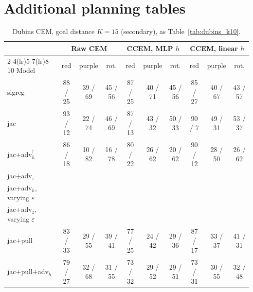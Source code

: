 \documentclass{article}
\begin{document}
\section{Additional planning tables}
\label{app:planning}
\begin{table}[t]\centering\small
\caption{Dubins CEM, goal distance $K=15$ (secondary), as Table~\ref{tab:dubins_k10}.}
\label{tab:dubins_k15}
\begin{tabular}{lccccccccc}
\toprule
 & \multicolumn{3}{c}{Raw CEM} & \multicolumn{3}{c}{CCEM, MLP $h$} & \multicolumn{3}{c}{CCEM, linear $h$} \\
\cmidrule(lr){2-4}\cmidrule(lr){5-7}\cmidrule(lr){8-10}
Model & red & purple & rot. & red & purple & rot. & red & purple & rot. \\
\midrule
sigreg & 88 / 25 & 39 / 69 & 45 / 56 & 87 / 25 & 40 / 71 & 45 / 56 & 85 / 27 & 40 / 67 & 43 / 57 \\
jac & 93 / 12 & 22 / 74 & 46 / 69 & 87 / 13 & 43 / 32 & 50 / 33 & 90 / 7 & 49 / 31 & 53 / 37 \\
jac+adv$_h^\dagger$ & 86 / 18 & 10 / 82 & 16 / 78 & 80 / 22 & 26 / 62 & 20 / 62 & 90 / 12 & 28 / 50 & 26 / 62 \\
jac+adv$_z$ &  &  &  &  &  &  &  &  &  \\
jac+adv$_h$, varying $\varepsilon$ &  &  &  &  &  &  &  &  &  \\
jac+adv$_z$, varying $\varepsilon$ &  &  &  &  &  &  &  &  &  \\
\midrule
jac+pull & 83 / 33 & 29 / 55 & 39 / 41 & 77 / 25 & 24 / 42 & 29 / 36 & 87 / 17 & 33 / 37 & 41 / 31 \\
jac+pull+adv$_h$ & 79 / 27 & 32 / 68 & 31 / 55 & 73 / 32 & 29 / 52 & 29 / 51 & 73 / 31 & 30 / 55 & 32 / 48 \\
\bottomrule
\end{tabular}
\end{table}
\end{document}
